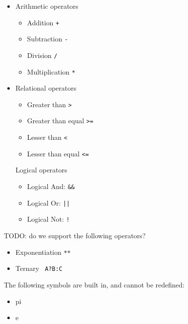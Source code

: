 \documentclass{article}
\begin{document}
\begin{itemize}
\item Arithmetic operators
\begin{itemize}
\item Addition \verb|+|
\item Subtraction \verb|-|
\item Division \verb|/|
\item Multiplication \verb|*|
\end{itemize}

\item Relational operators
\begin{itemize}
\item Greater than \verb|>|
\item Greater than equal \verb|>=|
\item Lesser than \verb|<|
\item Lesser than equal \verb|<=|
\end{itemize}

Logical operators
\begin{itemize}
\item Logical And: \verb|&&|
\item Logical Or:  \verb+||+
\item Logical Not: \verb|!|
\end{itemize}

\end{itemize}


TODO: do we support the following operators?
\begin{itemize}
\item Exponentiation \verb|**|
\item Ternary \verb| A?B:C |
\end{itemize}


The following symbols are built in, and cannot be redefined:
\begin{itemize}
\item pi
\item e
\end{itemize}
\end{document}

